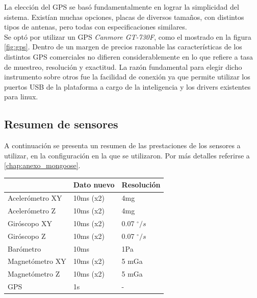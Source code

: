 \documentclass[main]{subfiles}
\begin{document}
La elecci\'on del GPS se bas\'o fundamentalmente en lograr la simplicidad del sistema. Exist\'ian muchas opciones, placas de diversos tama\~nos, con distintos tipos de antenas, pero todas con especificaciones similares.\\

Se opt\'o por utilizar un GPS \textit{Canmore GT-730F}, como el mostrado en la figura \ref{fig:gps}. Dentro de un margen de precios razonable las caracter\'isticas de los distintos GPS comerciales no difieren considerablemente en lo que refiere a tasa de muestreo, resoluci\'on y exactitud. La raz\'on fundamental para elegir dicho instrumento sobre otros fue la facilidad de conexi\'on ya que permite utilizar los puertos USB de la plataforma a cargo de la inteligencia y los drivers existentes para linux. \\ 

\subsection{Resumen de sensores}
\label{sec:hardware:resumen-de-sensores}

A continuaci\'on se presenta un resumen de las prestaciones de los sensores a utilizar, en la configuraci\'on en la que se utilizaron. Por m\'as detalles referirse a \ref{chap:anexo_mongoose}.

\begin{table}[H]
\begin{center}
\begin{tabular}{|p{3.5cm}|p{2.05cm}|p{2.05cm}|}
\hline
 & Dato nuevo & Resoluci\'on \\
\hline
Aceler\'ometro XY & 10ms (x2)& 4mg\\
\hline
Aceler\'ometro Z  & 10ms (x2)& 4mg\\
\hline
Gir\'oscopo XY  & 10ms (x2)& 0.07 $^\circ/s$\\
\hline
Gir\'oscopo Z  & 10ms (x2)& 0.07 $^\circ/s$\\
\hline
Bar\'ometro  & 10ms & 1Pa\\
\hline
Magnet\'ometro XY  & 10ms  (x2)& 5 mGa\\
\hline
Magnet\'ometro Z  & 10ms (x2)& 5 mGa\\
\hline
GPS  & 1s & - \\
\hline
\end{tabular}
\label{tab:hardware:resumen-sensores}
\end{center}
\end{table}
\end{document}
